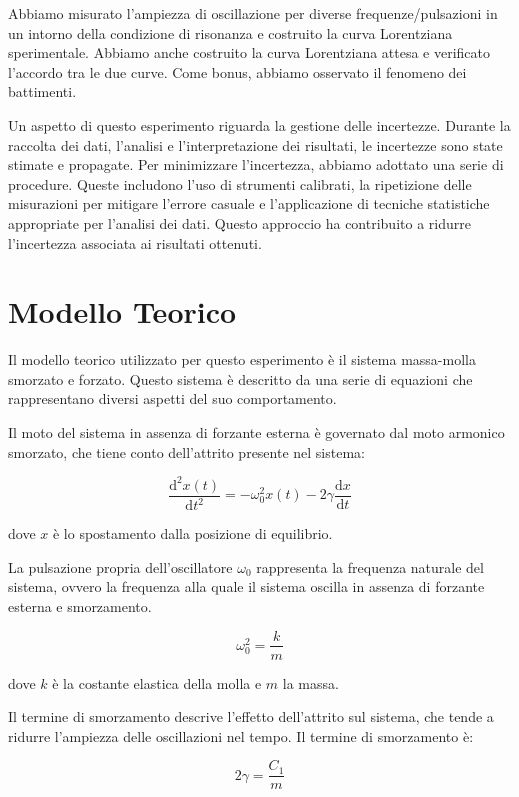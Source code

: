 \documentclass[12pt]{article}
\begin{document}
Abbiamo misurato l'ampiezza di oscillazione per diverse frequenze/pulsazioni in un intorno della condizione di risonanza e costruito la curva Lorentziana sperimentale. Abbiamo anche costruito la curva Lorentziana attesa e verificato l'accordo tra le due curve. Come bonus, abbiamo osservato il fenomeno dei battimenti.

Un aspetto di questo esperimento riguarda la gestione delle incertezze. Durante la raccolta dei dati, l'analisi e l'interpretazione dei risultati, le incertezze sono state stimate e propagate. Per minimizzare l'incertezza, abbiamo adottato una serie di procedure. Queste includono l'uso di strumenti calibrati, la ripetizione delle misurazioni per mitigare l'errore casuale e l'applicazione di tecniche statistiche appropriate per l'analisi dei dati. Questo approccio ha contribuito a ridurre l'incertezza associata ai risultati ottenuti.


\section{Modello Teorico}

Il modello teorico utilizzato per questo esperimento è il sistema massa-molla smorzato e forzato. Questo sistema è descritto da una serie di equazioni che rappresentano diversi aspetti del suo comportamento.

Il moto del sistema in assenza di forzante esterna è governato dal moto armonico smorzato, che tiene conto dell'attrito presente nel sistema:

\[
  {\frac{\mathrm{d^2}x(t)}{\mathrm{d}t^2}}=-\omega_0^2x(t)-2\gamma\frac{\mathrm{d} x}{\mathrm{d}t}
\]

dove $x$ è lo spostamento dalla posizione di equilibrio.

La pulsazione propria dell'oscillatore $\omega_0$ rappresenta la frequenza naturale del sistema, ovvero la frequenza alla quale il sistema oscilla in assenza di forzante esterna e smorzamento.

\[
  \omega_0^2=\frac{k}{m}
\]

dove $k$ è la costante elastica della molla e $m$ la massa.

Il termine di smorzamento descrive l'effetto dell'attrito sul sistema, che tende a ridurre l'ampiezza delle oscillazioni nel tempo. Il termine di smorzamento è:

\[
  2\gamma=\frac{C_1}{m}
\]
\end{document}
